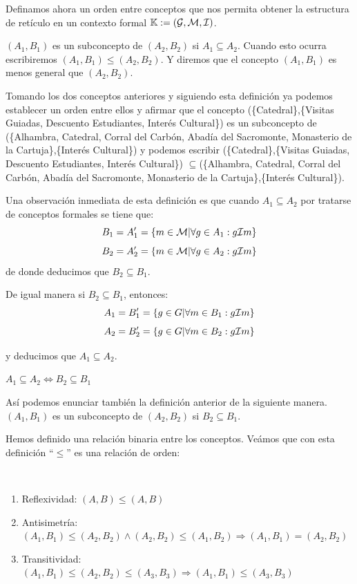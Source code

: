 \documentclass[oneside,openright,titlepage,numbers=noenddot,openany,headinclude,footinclude=true,
cleardoublepage=empty,abstractoff,BCOR=5mm,paper=a4,fontsize=12pt,main=spanish]{scrreprt}
\begin{document}
Definamos ahora un orden entre conceptos que nos permita obtener la estructura de retículo en un contexto formal $\mathbb{K}:=(\mathcal{G},\mathcal{M},\mathcal{I})$.

\begin{definition}

$(A_1,B_1)$ es un subconcepto de $(A_2,B_2)$ si $A_1 \subseteq A_2$. Cuando esto ocurra escribiremos $(A_1,B_1) \leq (A_2,B_2)$. Y diremos que el concepto $(A_1,B_1)$ es menos general que $(A_2,B_2)$.
\end{definition}

Tomando los dos conceptos anteriores y siguiendo esta definición ya podemos establecer un orden entre ellos y afirmar que el concepto (\{Catedral\},\{Visitas Guiadas, Descuento Estudiantes, Interés Cultural\}) es un subconcepto de (\{Alhambra, Catedral, Corral del Carbón, Abadía del Sacromonte, Monasterio de la Cartuja\},\{Interés Cultural\}) y podemos escribir (\{Catedral\},\{Visitas Guiadas, Descuento Estudiantes, Interés Cultural\}) $\subseteq$(\{Alhambra, Catedral, Corral del Carbón, Abadía del Sacromonte, Monasterio de la Cartuja\},\{Interés Cultural\}). 

Una observación inmediata de esta definición es que cuando $A_1 \subseteq A_2$ por tratarse de conceptos formales se tiene que:
$$B_1=A_1'=\{m\in \mathcal{M} | \forall g \in A_1 : g\mathcal{I} m\}$$
$$B_2=A_2'=\{m\in \mathcal{M} | \forall g \in A_2 : g\mathcal{I} m\}$$
de donde deducimos que $B_2 \subseteq B_1$.

De igual manera si $B_2 \subseteq B_1$, entonces:
$$A_1=B_1'=\{ g \in G | \forall m \in B_1 : g\mathcal{I} m\}$$
$$A_2=B_2'=\{ g \in G | \forall m \in B_2 : g\mathcal{I} m\}$$

y deducimos que $A_1 \subseteq A_2$.

\begin{corollary}\cite{willeconcept}
$A_1 \subseteq A_2 \Longleftrightarrow B_2 \subseteq B_1$
\end{corollary}

Así podemos enunciar también la definición anterior de la siguiente manera. $(A_1,B_1)$ es un subconcepto de $(A_2,B_2)$ si $B_2 \subseteq B_1$.

Hemos definido una relación binaria entre los conceptos. Veámos que con esta definición ``$\leq$'' es una relación de orden:

\begin{proposition}
$ \ $
\begin{enumerate}
    \item Reflexividad:  $(A,B) \leq (A,B)$
    
    \item Antisimetría: $(A_1,B_1) \leq (A_2,B_2) \wedge (A_2,B_2) \leq (A_1,B_2) \Longrightarrow (A_1,B_1) =(A_2,B_2)$
    
    \item Transitividad: $(A_1,B_1)\leq(A_2,B_2)\leq(A_3,B_3) \Longrightarrow (A_1,B_1) \leq (A_3,B_3)$
\end{enumerate}
\end{proposition}
\end{document}
